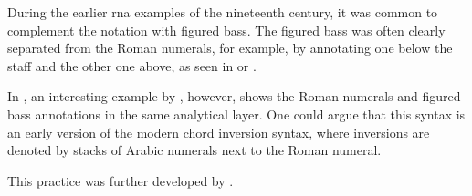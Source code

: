 
During the earlier \gls{rna} examples of the nineteenth
century, it was common to complement the notation with
figured bass. The figured bass was often clearly separated
from the Roman numerals, for example, by annotating one
below the staff and the other one above, as seen in
 or
.

In , an
interesting example by \textcite{bussler1878praktische},
however, shows the Roman numerals and figured bass
annotations in the same analytical layer. One could argue
that this syntax is an early version of the modern chord
inversion syntax, where inversions are denoted by stacks of
Arabic numerals next to the Roman numeral.


This practice was further developed by
\textcite{emery1879elements}. 

